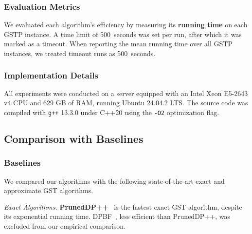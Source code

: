 \subsubsection{Evaluation Metrics}
\label{subsubsec: eva-metrics}
We evaluated each algorithm's efficiency by measuring its \textbf{running time} on each GSTP instance. A time limit of 500~seconds was set per run, after which it was marked as a timeout. When reporting the mean running time over all GSTP instances, we treated timeout runs as 500~seconds. 


\subsubsection{Implementation Details}

All experiments were conducted on a server equipped with an Intel Xeon E5-2643 v4 CPU and 629 GB of RAM, running Ubuntu 24.04.2 LTS. The source code was compiled with \texttt{g++} 13.3.0 under C++20 using the \texttt{-O2} optimization flag.

\subsection{Comparison with Baselines}
\label{subsec: Exp_TF}

\subsubsection{Baselines}
We compared our algorithms with the following state-of-the-art exact and approximate GST algorithms.

\emph{Exact Algorithms.} \textbf{PrunedDP++}~\cite{PrunedDP} is the fastest exact GST algorithm, despite its exponential running time. DPBF~\cite{KS_5}, less efficient than PrunedDP++, was excluded from our empirical comparison.

